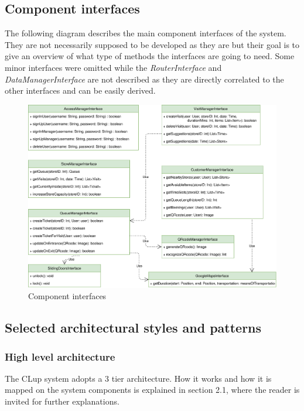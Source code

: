 \documentclass[]{article}
\begin{document}
	\subsection{Component interfaces}
	
	The following diagram describes the main component interfaces of the system. \newline
	They are not necessarily supposed to be developed as they are but their goal is to give an overview of what type of methods the interfaces are going to need. \newline
	Some minor interfaces were omitted while the \textit{RouterInterface} and \textit{DataManagerInterface} are not described as they are directly correlated to the other interfaces and can be easily derived. \newline
	
		\begin{figure}[H]
			\centering
			\includegraphics[scale=0.7]{ComponentView/componentInterfaces.png}
			\caption{Component interfaces}
			\label{fig:componentInterfaces}
		\end{figure}
	
	\newpage
	\subsection{Selected architectural styles and patterns}
	\medskip
	
	\subsubsection{High level architecture}
	The CLup system adopts a 3 tier architecture. 
	How it works and how it is mapped on the system components is explained in section 2.1, where the reader is invited for further explanations.
	
\end{document}

